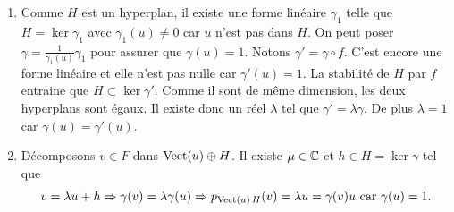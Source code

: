 \begin{enumerate}
\begin{enumerate}
 \item Comme $H$ est un hyperplan, il existe une forme linéaire $\gamma_1$ telle que $H=\ker \gamma_1$ avec $\gamma_1(u)\neq 0$ car $u$ n'est pas dans $H$. On peut poser $\gamma = \frac{1}{\gamma_1(u)}\gamma_1$ pour assurer que $\gamma(u)=1$.\newline
Notons $\gamma' = \gamma \circ f$. C'est encore une forme linéaire et elle n'est pas nulle car $\gamma'(u) = 1$. La stabilité de $H$ par $f$ entraine que $H \subset \ker \gamma'$. Comme il sont de même dimension, les deux hyperplans sont égaux. Il existe donc un réel $\lambda$ tel que $\gamma' = \lambda \gamma$. De plus $\lambda=1$ car $\gamma(u)=\gamma'(u)$. 
  
  \item Décomposons $v \in F$ dans $\operatorname{Vect}(u) \oplus H$. Il existe $\mu \in \mathbb{C}$ et $h \in H = \ker \gamma$ tel que 
\[
  v = \lambda u + h \Rightarrow \gamma(v) = \lambda \gamma(u) \Rightarrow p_{\operatorname{Vect}(u)\, H}(v) = \lambda u = \gamma(v)u \text{ car } \gamma(u) = 1.
\]

\end{enumerate}
\end{enumerate}

